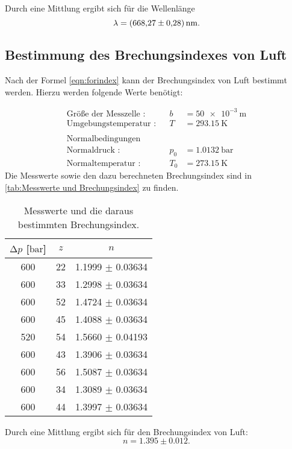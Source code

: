 \noindent
Durch eine Mittlung ergibt sich für die Wellenlänge
\begin{equation*}
  \lambda = \SI{668.27 \pm 0.28}{\nano\metre}.
\end{equation*}

\subsection{Bestimmung des Brechungsindexes von Luft}
\label{Brechungsindex}

Nach der Formel \eqref{eqn:forindex} kann der Brechungsindex von Luft bestimmt werden.
Hierzu werden folgende Werte benötigt:

\begin{align*}
  \text{Größe der Messzelle :}&   &b &= \SI{50e-3}{\metre} \\
  \text{Umgebungstemperatur :}&   &T &= \SI{293.15}{\kelvin} \\
  \\
  \text{Normalbedingungen} & \\
  \text{Normaldruck :}&           &p_0 &= \SI{1.0132}{\bar} \\
  \text{Normaltemperatur :}&      &T_0 &= \SI{273.15}{\kelvin}
\end{align*}
\noindent
Die Messwerte sowie den dazu berechneten Brechungsindex sind in \autoref{tab:Messwerte und Brechungsindex} zu finden.

\begin{table}
  \centering
  \caption{Messwerte und die daraus bestimmten Brechungsindex.}
  \label{tab:Messwerte und Brechungsindex}
  \begin{tabular}{c c c}
    \toprule
    {$\increment p$ [$\si{\bar}$]} & {$z$} & {$n$} \\
    \midrule
    600     &   22  &  1.1999 $\pm$ 0.03634\\
    600     &   33  &  1.2998 $\pm$ 0.03634\\
    600     &   52  &  1.4724 $\pm$ 0.03634\\
    600     &   45  &  1.4088 $\pm$ 0.03634\\
    520     &   54  &  1.5660 $\pm$ 0.04193\\
    600     &   43  &  1.3906 $\pm$ 0.03634\\
    600     &   56  &  1.5087 $\pm$ 0.03634\\
    600     &   34  &  1.3089 $\pm$ 0.03634\\
    600     &   44  &  1.3997 $\pm$ 0.03634\\
    \bottomrule
  \end{tabular}
\end{table}
\noindent
Durch eine Mittlung ergibt sich für den Brechungsindex von Luft:
\begin{equation*}
  n = 1.395 \pm 0.012.
\end{equation*}